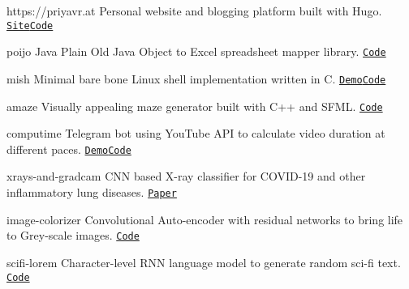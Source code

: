 \documentclass[9pt]{util} %
\begin{document}
\vspace{-10 pt}


\begin{entrylist}

    \project
    {https://priyavr.at}
    {Personal website and blogging platform built with Hugo.}
    {\texttt{{\href{https://priyavr.at}{Site}}}\slashsep\texttt{{\href{https://github.com/priyavrat-misra/personal-website}{Code}}}}

    \project
    {poijo}
    {Java Plain Old Java Object to Excel spreadsheet mapper library.}
    {\texttt{{\href{https://github.com/priyavrat-misra/poijo}{Code}}}}
    
    \project
    {mish}
    {Minimal bare bone Linux shell implementation written in C.}
    {\texttt{{\href{https://asciinema.org/a/702244}{Demo}}}\slashsep\texttt{{\href{https://github.com/priyavrat-misra/mish}{Code}}}}

    \project
    {amaze}
    {Visually appealing maze generator built with C++ and SFML.}
    {\texttt{{\href{https://github.com/priyavrat-misra/amaze}{Code}}}}

    \project
    {computime}
    {Telegram bot using YouTube API to calculate video duration at different paces.}
    {\texttt{{\href{https://telegram.me/iamspeed_bot}{Demo}}}\slashsep\texttt{{\href{https://github.com/priyavrat-misra/computime}{Code}}}}
    
	\project
	{xrays-and-gradcam}
	{CNN based X-ray classifier for COVID-19 and other inflammatory lung diseases.}
    {{\texttt{\href{https://doi.org/10.1007/s11042-023-16084-4}{Paper}}}}
    
    \project
    {image-colorizer}
    {Convolutional Auto-encoder with residual networks to bring life to Grey-scale images.}
    {\texttt{{\href{https://github.com/priyavrat-misra/image-colorizer}{Code}}}}

    \project
    {scifi-lorem}
    {Character-level RNN language model to generate random sci-fi text.}
    {\texttt{{\href{https://github.com/priyavrat-misra/scifi-lorem}{Code}}}}
    
\end{entrylist}

\vspace{-10 pt}
\end{document}
